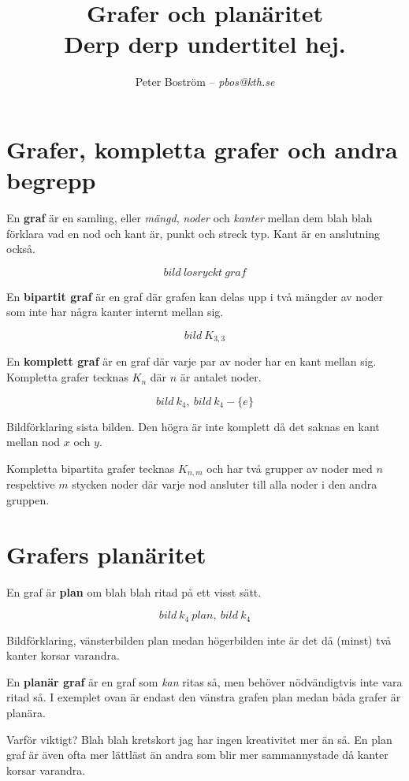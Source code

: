 \documentclass[a4paper,11pt]{article}
\title{Grafer och planäritet\\\vspace{4pt}\normalsize Derp derp undertitel hej.}
\author{Peter Boström -- \emph{pbos@kth.se}}
\begin{document}
\maketitle
\pagestyle{fancyplain}

\section*{Grafer, kompletta grafer och andra begrepp}

En \textbf{graf} är en samling, eller \emph{mängd}, \emph{noder} och \emph{kanter} mellan dem blah blah förklara vad en nod och kant är, punkt och streck typ. Kant är en anslutning också.

$$bild\ losryckt\ graf$$

En \textbf{bipartit graf} är en graf där grafen kan delas upp i två mängder av noder som inte har några kanter internt mellan sig.

$$bild\ K_{3,3}$$

En \textbf{komplett graf} är en graf där varje par av noder har en kant mellan sig. Kompletta grafer tecknas $K_n$ där $n$ är antalet noder.

$$bild\ k_4,\ bild\ k_4-\{e\}$$

Bildförklaring sista bilden. Den högra är inte komplett då det saknas en kant mellan nod $x$ och $y$.

Kompletta bipartita grafer tecknas $K_{n,m}$ och har två grupper av noder med $n$ respektive $m$ stycken noder där varje nod ansluter till alla noder i den andra gruppen.

\section*{Grafers planäritet}

En graf är \textbf{plan} om blah blah ritad på ett visst sätt.

$$bild\ k_4\ plan,\ bild\ k_4$$

Bildförklaring, vänsterbilden plan medan högerbilden inte är det då (minst) två kanter korsar varandra.

En \textbf{planär graf} är en graf som \emph{kan} ritas så, men behöver nödvändigtvis inte vara ritad så. I exemplet ovan är endast den vänstra grafen plan medan båda grafer är planära.

Varför viktigt? Blah blah kretskort jag har ingen kreativitet mer än så. En plan graf är även ofta mer lättläst än andra som blir mer sammannystade då kanter korsar varandra.
\end{document}
